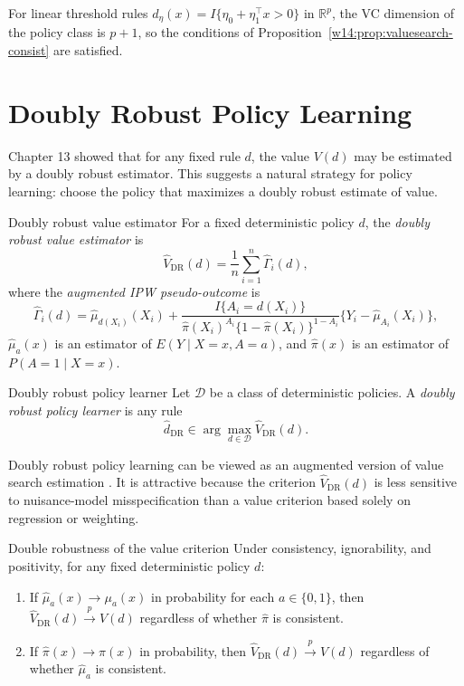 \documentclass[master.tex]{subfiles}
\begin{document}
\begin{remark}
For linear threshold rules \(d_\eta(x)=I\{\eta_0+\eta_1^\top x>0\}\) in
\(\mathbb R^p\), the VC dimension of the policy class is \(p+1\), so the
conditions of Proposition~\ref{w14:prop:valuesearch-consist} are satisfied.
\end{remark}

\section{Doubly Robust Policy Learning}
\label{w14:sec:drlearning}

Chapter 13 showed that for any fixed rule \(d\), the value \(V(d)\) may be estimated by a doubly robust estimator. This suggests a natural strategy for policy learning: choose the policy that maximizes a doubly robust estimate of value.

\begin{defn}{Doubly robust value estimator}
\label{w14:defn:dr-value}
For a fixed deterministic policy \(d\), the \emph{doubly robust value estimator} is
\[
\widehat V_{\mathrm{DR}}(d)
= \frac{1}{n}\sum_{i=1}^n \hat\Gamma_i(d),
\]
where the \emph{augmented IPW pseudo-outcome} is
\[
\hat\Gamma_i(d)
= \hat\mu_{d(X_i)}(X_i)
  + \frac{I\{A_i=d(X_i)\}}
         {\hat\pi(X_i)^{A_i}\{1-\hat\pi(X_i)\}^{1-A_i}}
    \bigl\{Y_i - \hat\mu_{A_i}(X_i)\bigr\},
\]
\(\hat\mu_a(x)\) is an estimator of \(E(Y\mid X=x,A=a)\), and \(\hat\pi(x)\) is an estimator of \(P(A=1\mid X=x)\).
\end{defn}

\begin{defn}{Doubly robust policy learner}
\label{w14:defn:drlearner}
Let \(\mathcal D\) be a class of deterministic policies. A \emph{doubly robust policy learner} is any rule
\[
\hat d_{\mathrm{DR}} \in \arg\max_{d\in\mathcal D} \widehat V_{\mathrm{DR}}(d).
\]
\end{defn}

\begin{remark}
Doubly robust policy learning can be viewed as an augmented version of value search estimation \citep{dudik2014doubly}. It is attractive because the criterion \(\widehat V_{\mathrm{DR}}(d)\) is less sensitive to nuisance-model misspecification than a value criterion based solely on regression or weighting.
\end{remark}

\begin{prop}{Double robustness of the value criterion}
\label{w14:prop:dr-value}
Under consistency, ignorability, and positivity, for any fixed deterministic
policy \(d\):
\begin{enumerate}
  \item[(i)] If \(\hat\mu_a(x)\to\mu_a(x)\) in probability for each
    \(a\in\{0,1\}\), then \(\widehat V_{\mathrm{DR}}(d)\xrightarrow{p}V(d)\)
    regardless of whether \(\hat\pi\) is consistent.
  \item[(ii)] If \(\hat\pi(x)\to\pi(x)\) in probability, then
    \(\widehat V_{\mathrm{DR}}(d)\xrightarrow{p}V(d)\) regardless of whether
    \(\hat\mu_a\) is consistent.
\end{enumerate}
\end{prop}
\end{document}
